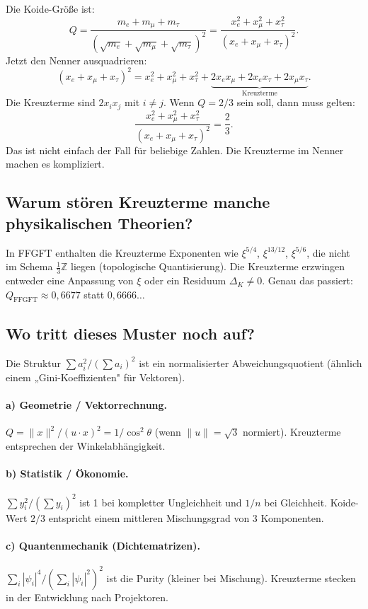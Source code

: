 Die Koide-Größe ist:
\[
  Q = \frac{m_e+m_\mu+m_\tau}{(\sqrt{m_e}+\sqrt{m_\mu}+\sqrt{m_\tau})^2}
  = \frac{x_e^2+x_\mu^2+x_\tau^2}{(x_e+x_\mu+x_\tau)^2}.
\]
Jetzt den Nenner ausquadrieren:
\[
  (x_e+x_\mu+x_\tau)^2 = x_e^2+x_\mu^2+x_\tau^2
  + \underbrace{2x_ex_\mu+2x_ex_\tau+2x_\mu x_\tau}_{\text{Kreuzterme}}.
\]
Die Kreuzterme sind $2x_ix_j$ mit $i\neq j$.
Wenn $Q=2/3$ sein soll, dann muss gelten:
\[
  \frac{x_e^2+x_\mu^2+x_\tau^2}{(x_e+x_\mu+x_\tau)^2}=\frac{2}{3}.
\]
Das ist nicht einfach der Fall für beliebige Zahlen.
Die Kreuzterme im Nenner machen es kompliziert.

\subsection{Warum stören Kreuzterme manche physikalischen Theorien?}

In FFGFT enthalten die Kreuzterme Exponenten wie $\xi^{5/4}$,
$\xi^{13/12}$, $\xi^{5/6}$, die nicht im Schema $\tfrac{1}{3}\mathbb{Z}$
liegen (topologische Quantisierung). Die Kreuzterme erzwingen entweder
eine Anpassung von $\xi$ oder ein Residuum $\Delta_K\neq0$.
Genau das passiert: $Q_{\text{FFGFT}}\approx0{,}6677$ statt $0{,}6666\ldots$

\subsection{Wo tritt dieses Muster noch auf?}

Die Struktur $\sum a_i^2/(\sum a_i)^2$ ist ein normalisierter
Abweichungsquotient (ähnlich einem „Gini-Koeffizienten" für Vektoren).

\paragraph{a) Geometrie / Vektorrechnung.}
$Q=\|x\|^2/(u\cdot x)^2=1/\cos^2\theta$ (wenn $\|u\|=\sqrt{3}$ normiert).
Kreuzterme entsprechen der Winkelabhängigkeit.

\paragraph{b) Statistik / Ökonomie.}
$\sum y_i^2/(\sum y_i)^2$ ist 1 bei kompletter Ungleichheit und $1/n$ bei Gleichheit.
Koide-Wert $2/3$ entspricht einem mittleren Mischungsgrad von 3 Komponenten.

\paragraph{c) Quantenmechanik (Dichtematrizen).}
$\sum_i|\psi_i|^4/(\sum_i|\psi_i|^2)^2$ ist die Purity (kleiner bei Mischung).
Kreuzterme stecken in der Entwicklung nach Projektoren.

